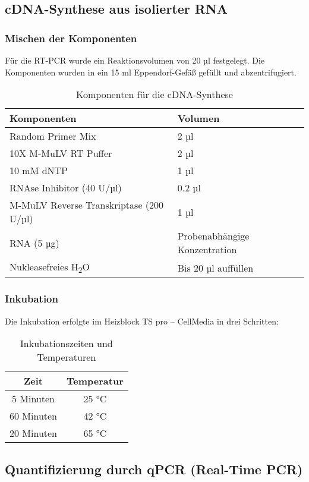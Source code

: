 \documentclass{article}
\begin{document}
\subsection{cDNA-Synthese aus isolierter RNA}

\subsubsection*{Mischen der Komponenten}
Für die RT-PCR wurde ein Reaktionsvolumen von 20 µl festgelegt. Die Komponenten wurden in ein 15 ml Eppendorf-Gefäß gefüllt und abzentrifugiert.

\begin{table}[H]
\centering
\begin{tabular}{|l|l|}
\hline
\textbf{Komponenten} & \textbf{Volumen} \\ \hline
Random Primer Mix & 2 µl \\ \hline
10X M-MuLV RT Puffer & 2 µl \\ \hline
10 mM dNTP & 1 µl \\ \hline
RNAse Inhibitor (40 U/µl) & 0.2 µl \\ \hline
M-MuLV Reverse Transkriptase (200 U/µl) & 1 µl \\ \hline
RNA (5 µg) & Probenabhängige Konzentration \\ \hline
Nukleasefreies H\textsubscript{2}O & Bis 20 µl auffüllen \\ \hline
\end{tabular}
\caption{Komponenten für die cDNA-Synthese}
\end{table}

\subsubsection*{Inkubation}
Die Inkubation erfolgte im Heizblock TS pro – CellMedia in drei Schritten:
\begin{table}[H]
    \centering
    \begin{tabular}{|c|c|}
    \hline
    \textbf{Zeit} & \textbf{Temperatur} \\ \hline
    5 Minuten & 25 °C \\ \hline
    60 Minuten & 42 °C \\ \hline
    20 Minuten & 65 °C \\ \hline
    \end{tabular}
    \caption{Inkubationszeiten und Temperaturen}
    \end{table}

\subsection{Quantifizierung durch qPCR (Real-Time PCR)}
\end{document}

